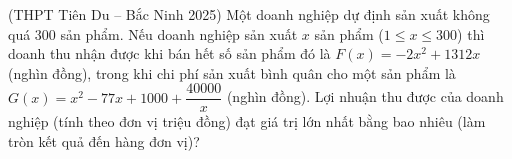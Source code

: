 \begin{ex}
(THPT Tiên Du -- Bắc Ninh 2025) Một doanh nghiệp dự định sản xuất không quá $300$ sản phẩm. Nếu doanh nghiệp sản xuất $x$ sản phẩm ($1\le x\le300$) thì doanh thu nhận được khi bán hết số sản phẩm đó là $F(x)=-2x^2+1312x$ (nghìn đồng), trong khi chi phí sản xuất bình quân cho một sản phẩm là $G(x)=x^2-77x+1000+\dfrac{40000}x$ (nghìn đồng). Lợi nhuận thu được của doanh nghiệp (tính theo đơn vị triệu đồng) đạt giá trị lớn nhất bằng bao nhiêu (làm tròn kết quả đến hàng đơn vị)?
\end{ex}
